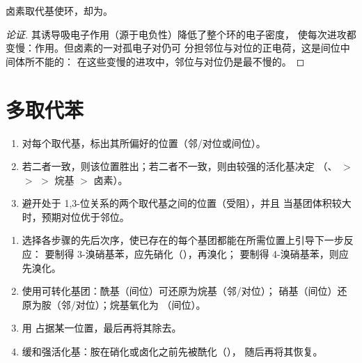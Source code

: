 \begin{proposition}[卤素]\label{prop:b2:aromatic-substitution:halogens}
卤素取代基使环，却为。
\end{proposition}

\begin{proof}[论证]
其诱导吸电子作用（源于电负性）降低了整个环的电子密度，
使每次进攻都变慢：作用。但卤素的一对孤电子对仍可
分担邻位与对位的正电荷，这是间位中间体所不能的：
在这些变慢的进攻中，邻位与对位仍是最不慢的。
\end{proof}

\section{多取代苯}

\begin{method}[预测取代位置]\label{met:b2:aromatic-substitution:predict-position}
\begin{enumerate}
  \item 对每个取代基，标出其所偏好的位置（邻/对位或间位）。
  \item 若二者一致，则该位置胜出；若二者不一致，则由较强的活化基决定
        （、 $>$  $>$  $>$ 烷基 $>$ 卤素）。
  \item 避开处于 1,3-位关系的两个取代基之间的位置（受阻），并且
        当基团体积较大时，预期对位优于邻位。
\end{enumerate}
\end{method}

\begin{method}[芳香化合物的合成规划]\label{met:b2:aromatic-substitution:plan-aromatic}
\begin{enumerate}
  \item 选择各步骤的先后次序，使已存在的每个基团都能在所需位置上引导下一步反应：
        要制得 3-溴硝基苯，应先硝化（），再溴化；
        要制得 4-溴硝基苯，则应先溴化。
  \item 使用可转化基团：酰基（间位）可还原为烷基（邻/对位）；
        硝基（间位）还原为胺（邻/对位）；烷基氧化为
        （间位）。
  \item 用  占据某一位置，最后再将其除去。
  \item 缓和强活化基：胺在硝化或卤化之前先被酰化（），
        随后再将其恢复。
\end{enumerate}
\end{method}

